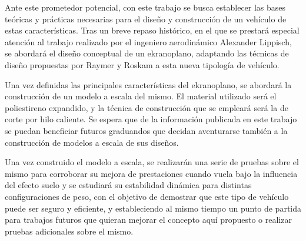 Ante este prometedor potencial, con este trabajo se busca establecer las bases teóricas y prácticas necesarias para el diseño y construcción de un vehículo de estas características. Tras un breve repaso histórico, en el que se prestará especial atención al trabajo realizado por el ingeniero aerodinámico Alexander Lippisch, se abordará el diseño conceptual de un ekranoplano, adaptando las técnicas de diseño propuestas por Raymer\cite{ref:raymer} y Roskam\cite{ref:roskam} a esta nueva tipología de vehículo.

Una vez definidas las principales características del ekranoplano, se abordará la construcción de un modelo a escala del mismo. El material utilizado será el poliestireno expandido, y la técnica de construcción que se empleará será la de corte por hilo caliente\cite{ref:hotwirecut}. Se espera que de la información publicada en este trabajo se puedan beneficiar futuros graduandos que decidan aventurarse también a la construcción de modelos a escala de sus diseños.

Una vez construido el modelo a escala, se realizarán una serie de pruebas sobre el mismo para corroborar su mejora de prestaciones cuando vuela bajo la influencia del efecto suelo y se estudiará su estabilidad dinámica para distintas configuraciones de peso, con el objetivo de demostrar que este tipo de vehículo puede ser seguro y eficiente, y estableciendo al mismo tiempo un punto de partida para trabajos futuros que quieran mejorar el concepto aquí propuesto o realizar pruebas adicionales sobre el mismo.
